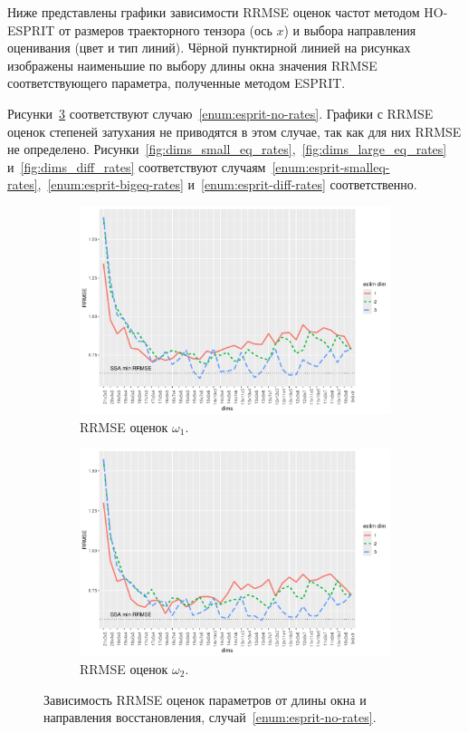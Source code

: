 \documentclass[specialist,
  substylefile=spbu.rtx,
subf,href,colorlinks=true, 12pt]{disser}
\theoremstyle{plain}
\theoremstyle{definition}
\theoremstyle{remark}
\begin{document}
Ниже представлены графики зависимости RRMSE оценок частот методом HO-ESPRIT от размеров траекторного тензора
(ось $x$) и выбора направления оценивания (цвет и тип линий).
Чёрной пунктирной линией на рисунках изображены наименьшие по выбору длины окна значения RRMSE
соответствующего параметра, полученные методом ESPRIT.

Рисунки~\ref{fig:dims_no_rates} соответствуют случаю~\ref{enum:esprit-no-rates}.
Графики с RRMSE оценок степеней затухания не приводятся в этом случае, так как для них RRMSE не определено.
Рисунки~\ref{fig:dims_small_eq_rates},~\ref{fig:dims_large_eq_rates} и~\ref{fig:dims_diff_rates}
соответствуют случаям~\ref{enum:esprit-smalleq-rates},~\ref{enum:esprit-bigeq-rates} и~\ref{enum:esprit-diff-rates}
соответственно.
\begin{figure}[!ht]
  \centering
  \begin{subfigure}{0.49\linewidth}
    \includegraphics[width=\linewidth]{freq1_dims_no_rates.pdf}
    \caption{RRMSE оценок $\omega_1$.}
    \label{fig:freq1_dims_no_rates}
  \end{subfigure}
  \begin{subfigure}{0.49\linewidth}
    \includegraphics[width=\linewidth]{freq2_dims_no_rates.pdf}
    \caption{RRMSE оценок $\omega_2$.}
    \label{fig:freq2_dims_no_rates}
  \end{subfigure}
  \caption{Зависимость RRMSE оценок параметров от длины окна и направления восстановления,
  случай~\ref{enum:esprit-no-rates}.}
  \label{fig:dims_no_rates}
\end{figure}
\end{document}
